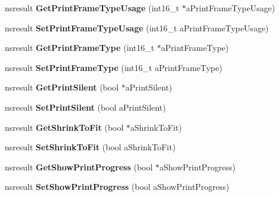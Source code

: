 \begin{DoxyCompactItemize}
nsresult {\bfseries Get\+Print\+Frame\+Type\+Usage} (int16\+\_\+t $\ast$a\+Print\+Frame\+Type\+Usage)
\item 
\mbox{\label{interfacens_i_print_settings_a06dd144013bd48ab023a8b29f88cff09}} 
nsresult {\bfseries Set\+Print\+Frame\+Type\+Usage} (int16\+\_\+t a\+Print\+Frame\+Type\+Usage)
\item 
\mbox{\label{interfacens_i_print_settings_a6961f1d87ab743dcb20e2129d0f3921e}} 
nsresult {\bfseries Get\+Print\+Frame\+Type} (int16\+\_\+t $\ast$a\+Print\+Frame\+Type)
\item 
\mbox{\label{interfacens_i_print_settings_a60b70debb57f5cbf8408d3951a9baba8}} 
nsresult {\bfseries Set\+Print\+Frame\+Type} (int16\+\_\+t a\+Print\+Frame\+Type)
\item 
\mbox{\label{interfacens_i_print_settings_ab7f398d5371432e648e8e54f99a2bdf1}} 
nsresult {\bfseries Get\+Print\+Silent} (bool $\ast$a\+Print\+Silent)
\item 
\mbox{\label{interfacens_i_print_settings_a183ec78a1c67814014678e80ad69df8f}} 
nsresult {\bfseries Set\+Print\+Silent} (bool a\+Print\+Silent)
\item 
\mbox{\label{interfacens_i_print_settings_a14d6d4191ee3b131af5b28b47f4bebc7}} 
nsresult {\bfseries Get\+Shrink\+To\+Fit} (bool $\ast$a\+Shrink\+To\+Fit)
\item 
\mbox{\label{interfacens_i_print_settings_a9edf7aa228c5fe5a4675fac2f1aa14f6}} 
nsresult {\bfseries Set\+Shrink\+To\+Fit} (bool a\+Shrink\+To\+Fit)
\item 
\mbox{\label{interfacens_i_print_settings_a1056f33ea8b1095f981023a44216fa6e}} 
nsresult {\bfseries Get\+Show\+Print\+Progress} (bool $\ast$a\+Show\+Print\+Progress)
\item 
\mbox{\label{interfacens_i_print_settings_a325afb196cbbc5f450b62b0fb1478a61}} 
nsresult {\bfseries Set\+Show\+Print\+Progress} (bool a\+Show\+Print\+Progress)

\end{DoxyCompactItemize}
